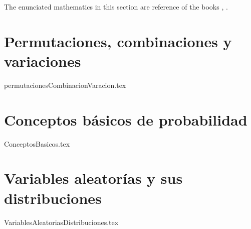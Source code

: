 The enunciated mathematics in this section are reference of the books \cite{Liliana2012}, \cite{Brualdi2009}.
\section{Permutaciones, combinaciones y variaciones}
{permutacionesCombinacionVaracion.tex}
\section{Conceptos b\'asicos de probabilidad}
{ConceptosBasicos.tex}
\section{Variables aleator\'ias y sus distribuciones}
{VariablesAleatoriasDistribuciones.tex}